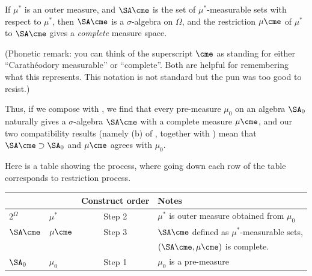 \begin{theorem}
	\label{thm:cara_outer}
	If $\mu^\ast$ is an outer measure,
	and $\SA\cme$ is the set of $\mu^\ast$-measurable sets
	with respect to $\mu^\ast$,
	then $\SA\cme$ is a $\sigma$-algebra on $\Omega$,
	and the restriction $\mu\cme$ of $\mu^\ast$ to $\SA\cme$
	gives a \emph{complete} measure space.
\end{theorem}
(Phonetic remark: you can think of the superscript ${}\cme$ as standing
for either ``Carath\'{e}odory measurable'' or ``complete''.
Both are helpful for remembering what this represents.
This notation is not standard but the pun was too good to resist.)

Thus, if we compose  with ,
we find that every pre-measure $\mu_0$ on an algebra $\SA_0$ naturally
gives a $\sigma$-algebra $\SA\cme$ with a complete measure $\mu\cme$,
and our two compatibility results
(namely (b) of ,
together with )
mean that $\SA\cme \supset \SA_0$
and $\mu\cme$ agrees with $\mu_0$.

Here is a table showing the process,
where going down each row of the table corresponds to restriction process.
\begin{center}
	\begin{tabular}[h]{llcl}
		& & Construct order & Notes \\ \hline
		$2^\Omega$ & $\mu^\ast$ & Step 2 &
			$\mu^\ast$ is outer measure obtained from $\mu_0$ \\[1em]
		$\SA\cme$ & $\mu\cme$ & Step 3 & $\SA\cme$ defined as $\mu^\ast$-measurable sets, \\
		&&& $(\SA\cme, \mu\cme)$ is complete. \\[1em]
		$\SA_0$ & $\mu_0$ & Step 1 & $\mu_0$ is a pre-measure
	\end{tabular}
\end{center}


